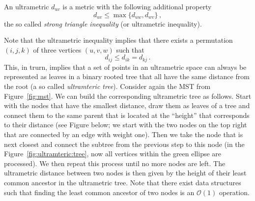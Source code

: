 \begin{definition*}
  An ultrametric $d_{uv}$ is a metric with the following additional property
  \begin{equation*}
    d_{uv} \le \max\{ d_{uw}, d_{wv}\}\,,
  \end{equation*}
  the so called \emph{strong triangle inequality} (or ultrametric inequality).
\end{definition*}
Note that the ultrametric inequality implies that there exists a permutation
$(i,j,k)$ of three vertices $(u,v,w)$ such that
\begin{equation*}
  d_{ij} \le d_{ik} = d_{kj}\,.
\end{equation*}
This, in trurn, implies that a set of points in an ultrametric space can always
be represented as leaves in a binary rooted tree that all have the same distance
from the root (a so called \emph{ultramteric tree}). Consider again the MST from
Figure~\ref{fig:mst}. We can build the corresponding ultrametric tree as
follows. Start with the nodes that have the smallest distance, draw them as
leaves of a tree and connect them to the same parent that is located at the
``height'' that corresponds to their distance (see Figure below; we start with
the two nodes on the top right that are connected by an edge with weight
one). Then we take the node that is next closest and connect the subtree from
the previous step to this node (in the Figure~\ref{fig:ultramteric:tree}, now
all vertices within the green ellipse are processed). We then repeat this
process until no more nodes are left. The ultrametric distance between two nodes
is then given by the height of their least common ancestor in the ultrametric
tree. Note that there exist data structures such that finding the least common
ancestor of two nodes is an $\mathcal{O}(1)$ operation.

